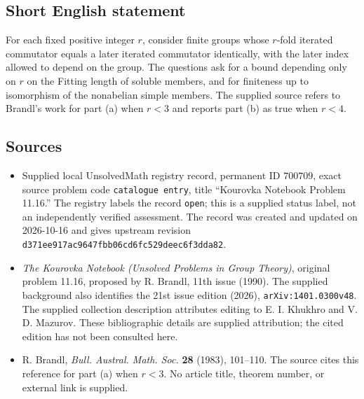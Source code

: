 \documentclass[11pt]{article}
\begin{document}
\subsection{Short English statement}
For each fixed positive integer \(r\), consider finite groups whose \(r\)-fold iterated commutator equals a later iterated commutator identically, with the later index allowed to depend on the group. The questions ask for a bound depending only on \(r\) on the Fitting length of soluble members, and for finiteness up to isomorphism of the nonabelian simple members. The supplied source refers to Brandl's work for part (a) when \(r<3\) and reports part (b) as true when \(r<4\).
\subsection{Sources}
\begin{itemize}
\item Supplied local UnsolvedMath registry record, permanent ID \(700709\), exact source problem code \texttt{catalogue entry}, title ``Kourovka Notebook Problem 11.16.'' The registry labels the record \texttt{open}; this is a supplied status label, not an independently verified assessment. The record was created and updated on 2026-10-16 and gives upstream revision \texttt{d371ee917ac9647fbb06cd6fc529deec6f3dda82}.
\item \emph{The Kourovka Notebook (Unsolved Problems in Group Theory)}, original problem 11.16, proposed by R. Brandl, 11th issue (1990). The supplied background also identifies the 21st issue edition (2026), \texttt{arXiv:1401.0300v48}. The supplied collection description attributes editing to E. I. Khukhro and V. D. Mazurov. These bibliographic details are supplied attribution; the cited edition has not been consulted here.
\item R. Brandl, \emph{Bull. Austral. Math. Soc.} \textbf{28} (1983), 101--110. The source cites this reference for part (a) when \(r<3\). No article title, theorem number, or external link is supplied.
\end{itemize}
\end{document}
